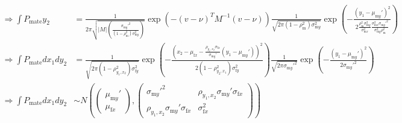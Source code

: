 \documentclass{article}
\newcommand{\x}[1]{\text{#1}}
\begin{document}
\begin{landscape}
\begin{align*}
\Rightarrow \int P_\text{mate} y_2&=\frac{1}{2\pi\sqrt{|M|\left(\frac{\sigma_{\x{m}y}'^2}{(1-\rho_\x{m}^2)\sigma_{\x{m}y}^2}\right)}}\exp\left(-(v-\nu)^TM^{-1}(v-\nu)\right)\frac{1}{\sqrt{2\pi(1-\rho_\x{m}^2)\sigma_{\x{m}y}^2}}\exp\left(-\frac{(y_1-\mu_{\x{m}y}')^2}{2\frac{\rho_\x{m}^2\sigma_{\x{m}y}^2}{\sigma_{\x{m}x}^2}\frac{\sigma_{\x{m}x}^2\sigma_{\x{m}y}'^2}{\sigma_{\x{m}y}^2\rho_\x{m}^2}}\right)
\\ \Rightarrow \int P_\text{mate} dx_1dy_2 &= \frac{1}{\sqrt{2\pi (1-\rho_{y_1,x_2}^2)\sigma_{\x{f}y}^2}}\exp\left(-\frac{\left(x_2-\mu_{\x{f}x}-\frac{\rho_{y_1,x_2}\sigma_{\x{f}x}}{\sigma_{\x{m}y}'}(y_1-\mu_{\x{m}y}')\right)^2}{2(1-\rho_{y_2,x_1}^2)\sigma_{\x{f}y}^2}\right)\frac{1}{\sqrt{2\pi\sigma_{\x{m}y}'^2}}\exp\left(-\frac{(y_1-\mu_{\x{m}y}')^2}{2\sigma_{\x{m}y}'^2}\right)
\\ \Rightarrow \int P_\text{mate} dx_1dy_2&\sim N\left(\left(\begin{array}{cc} \mu_{\x{m}y}' \\ \mu_{\x{f}x}\end{array} \right),\left(\begin{array}{cc} \sigma_{\x{m}y}'^2 & \rho_{y_1,x_2}\sigma_{\x{m}y}'\sigma_{\x{f}x} \\ \rho_{y_1,x_2}\sigma_{\x{m}y}'\sigma_{\x{f}x} & \sigma_{\x{f}x}^2\end{array}\right)\right)
\end{align*}



\end{landscape}
\end{document}

